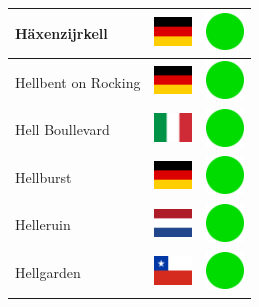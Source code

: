 \documentclass[12pt, a4paper, twoside]{report}
\begin{document}
\begin{center}
\begin{longtable}{|p{5cm}|p{2cm}|p{2cm}|}
 Häxenzijrkell                                              & \includegraphics[width=1cm]{../4x3/de} &   \includegraphics[width=1cm]{../likes/y} \\ \hline
 Hellbent on Rocking                                        & \includegraphics[width=1cm]{../4x3/de} &   \includegraphics[width=1cm]{../likes/y} \\ \hline
 Hell Boullevard                                            & \includegraphics[width=1cm]{../4x3/it} &   \includegraphics[width=1cm]{../likes/y} \\ \hline
 Hellburst                                                  & \includegraphics[width=1cm]{../4x3/de} &   \includegraphics[width=1cm]{../likes/y} \\ \hline
 Helleruin                                                  & \includegraphics[width=1cm]{../4x3/nl} &   \includegraphics[width=1cm]{../likes/y} \\ \hline
 Hellgarden                                                 & \includegraphics[width=1cm]{../4x3/cl} &   \includegraphics[width=1cm]{../likes/y} \\ \hline

\end{longtable}
\end{center}
\end{document}
